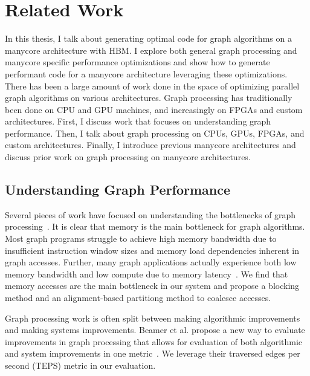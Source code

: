 \chapter{Related Work}\label{gen:sec:relatedwork}


In this thesis, I talk about generating optimal code for graph algorithms on a manycore architecture with HBM. 
I explore both general graph processing and manycore specific performance optimizations and show how to generate performant code for a manycore architecture leveraging these optimizations. 
There has been a large amount of work done in the space of optimizing parallel graph algorithms on various architectures.
Graph processing has traditionally been done on CPU and GPU machines, and increasingly on FPGAs and custom architectures. 
First, I discuss work that focuses on understanding graph performance.
Then, I talk about graph processing on CPUs, GPUs, FPGAs, and custom architectures.
Finally, I introduce previous manycore architectures and discuss prior work on graph processing on manycore architectures.

\section{Understanding Graph Performance} Several pieces of work have focused on understanding the bottlenecks of graph processing~\citep{beamer2015locality, basak2019analysis}. It is clear that memory is the main bottleneck for graph algorithms. Most graph programs struggle to achieve high memory bandwidth due to insufficient instruction window sizes and memory load dependencies inherent in graph accesses. Further, many graph applications actually experience both low memory bandwidth and low compute due to memory latency~\cite{beamer2015locality}.
We find that memory accesses are the main bottleneck in our system and propose a blocking method and an alignment-based partitiong method to coalesce accesses.

Graph processing work is often split between making algorithmic improvements and making systems improvements. 
Beamer et al. propose a new way to evaluate improvements in graph processing that allows for evaluation of both algorithmic and system improvements in one metric~\citep{beamer2015gail}.
We leverage their traversed edges per second (TEPS) metric in our evaluation.

